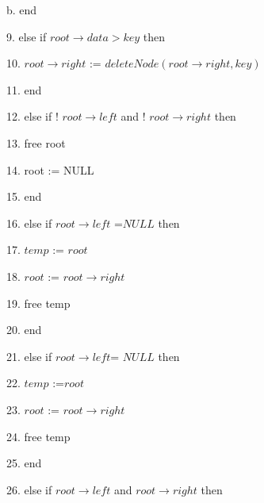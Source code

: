 \documentclass{article}
\begin{document}
b.\hspace{40pt} end

9.\hspace{40pt} else if $root\rightarrow data > key$ \hspace{5pt} then

10.\hspace{50pt} $root\rightarrow right$ := $deleteNode(root\rightarrow right, key)$

11.\hspace{40pt} end

12.\hspace{40pt} else if ! $root\rightarrow left$ \hspace{5pt} and \hspace{5pt}  ! $root\rightarrow right$ \hspace{5pt}then

13.\hspace{50pt} free root

14.\hspace{50pt} root := NULL 

15.\hspace{40pt} end

16.\hspace{40pt} else if $root\rightarrow left$ =$ NULL$ \hspace{5pt} then

17.\hspace{50pt} $temp$ := $root$

18.\hspace{50pt} $root$ := $root\rightarrow right$

19.\hspace{50pt} free temp

20.\hspace{40pt} end

21.\hspace{40pt} else if $root\rightarrow left $= $NULL$ \hspace{5pt} then

22.\hspace{50pt} $temp$ :=$ root$

23.\hspace{50pt} $root$ := $root\rightarrow right$

24.\hspace{50pt} free temp

25.\hspace{40pt} end

26.\hspace{40pt} else if $root\rightarrow left$ \hspace{5pt} and \hspace{5pt} $root\rightarrow right$ then
\end{document}
